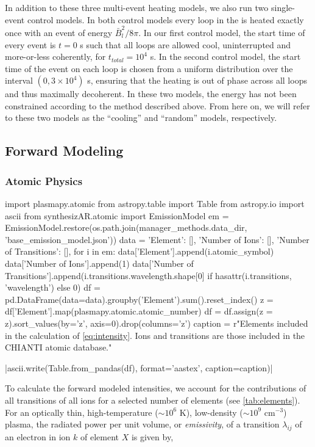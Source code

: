 In addition to these three multi-event heating models, we also run two single-event control models. In both control models every loop in the \AR{} is heated exactly once with an event of energy $\bar{B}_l^2/8\pi$. In our first control model, the start time of every event is $t=0$ s such that all loops are allowed cool, uninterrupted and more-or-less coherently, for $t_{total}=10^4$ s. In the second control model, the start time of the event on each loop is chosen from a uniform distribution over the interval $(0, 3\times10^4)$ s, ensuring that the heating is out of phase across all loops and thus maximally decoherent. In these two models, the energy has not been constrained according to the method described above. From here on, we will refer to these two models as the ``cooling'' and ``random'' models, respectively.

\subsection{Forward Modeling}\label{forward}

\subsubsection{Atomic Physics}\label{atomic}

\begin{pycode}
import plasmapy.atomic
from astropy.table import Table
from astropy.io import ascii
from synthesizAR.atomic import EmissionModel
em = EmissionModel.restore(os.path.join(manager_methods.data_dir, 'base_emission_model.json'))
data = {'Element': [], 'Number of Ions': [], 'Number of Transitions': [],}
for i in em:
    data['Element'].append(i.atomic_symbol)
    data['Number of Ions'].append(1)
    data['Number of Transitions'].append(i.transitions.wavelength.shape[0] if hasattr(i.transitions, 'wavelength') else 0)
df = pd.DataFrame(data=data).groupby('Element').sum().reset_index()
z = df['Element'].map(plasmapy.atomic.atomic_number)
df = df.assign(z = z).sort_values(by='z', axis=0).drop(columns='z')
caption = r"Elements included in the calculation of \autoref{eq:intensity}. Ions and transitions are those included in the CHIANTI atomic database.\label{tab:elements}"
\end{pycode}
|ascii.write(Table.from_pandas(df), format='aastex', caption=caption)|

To calculate the forward modeled intensities, we account for the contributions of all transitions of all ions for a selected number of elements (see \autoref{tab:elements}). For an optically thin, high-temperature ($\sim10^6$ K), low-density ($\sim10^9$ cm$^{-3}$) plasma, the radiated power per unit volume, or \textit{emissivity}, of a transition $\lambda_{ij}$ of an electron in ion $k$ of element $X$ is given by,

